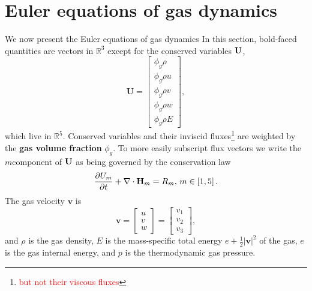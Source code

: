 \section{Euler equations of gas dynamics\label{sec:gaseom}}
We now present the Euler equations of gas dynamics
In this section, bold-faced quantities are vectors in $\mathbb{R}^3$ except for the conserved variables
${\bf U}$,
\begin{equation}
  \mathbf{U}=\left[\begin{array}{l} \phi_g \rho \\ \phi_g \rho u \\ \phi_g \rho v \\ \phi_g \rho w \\ \phi_g \rho E \end{array}\right],
  \label{uvect}
\end{equation}
which live in $\mathbb{R}^5$. Conserved variables and their inviscid fluxes\footnote{\textcolor{red}{but not their viscous fluxes}}
are weighted by the \textbf{gas volume fraction} $\phi_g$. To more easily subscript flux vectors we write the $m$\nth component of ${\bf U}$ as being governed by the
conservation law
\begin{equation}
\pp{U_m}{t} + \divnce \bH_m=R_m,\, m\in\left[1,5\right].%
\label{conslaw}
\end{equation}
The gas velocity $\mathbf{v}$ is %
\begin{equation}
\mathbf{v}=\left[\begin{array}{l} u \\ v \\ w \end{array}\right]=
\left[\begin{array}{l} v_1 \\ v_2 \\ v_3 \end{array}\right],%
\label{uxpedantic}
\end{equation}
and $\rho$ is the gas density, $E$ is the mass-specific total energy $e+\frac{1}{2}|\mathbf{v}|^2$ of
the gas, $e$ is the gas internal energy, and $p$ is the thermodynamic gas pressure.

